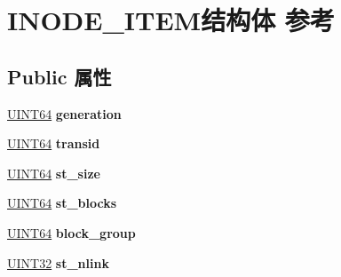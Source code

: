 \hypertarget{struct_i_n_o_d_e___i_t_e_m}{}\section{I\+N\+O\+D\+E\+\_\+\+I\+T\+E\+M结构体 参考}
\label{struct_i_n_o_d_e___i_t_e_m}
\subsection*{Public 属性}
\begin{DoxyCompactItemize}
\item 
\mbox{\label{struct_i_n_o_d_e___i_t_e_m_ae1213327dd2a96efffd134b49860bcc4}} 
\hyperlink{_processor_bind_8h_a57be03562867144161c1bfee95ca8f7c}{U\+I\+N\+T64} {\bfseries generation}
\item 
\mbox{\label{struct_i_n_o_d_e___i_t_e_m_aaff7c5d9d3e0c0fb381c4fcd719741be}} 
\hyperlink{_processor_bind_8h_a57be03562867144161c1bfee95ca8f7c}{U\+I\+N\+T64} {\bfseries transid}
\item 
\mbox{\label{struct_i_n_o_d_e___i_t_e_m_a495b37d08c43431b02232f6c1a5675f8}} 
\hyperlink{_processor_bind_8h_a57be03562867144161c1bfee95ca8f7c}{U\+I\+N\+T64} {\bfseries st\+\_\+size}
\item 
\mbox{\label{struct_i_n_o_d_e___i_t_e_m_a63b4e31230bb3bac45873bc339a9ac6f}} 
\hyperlink{_processor_bind_8h_a57be03562867144161c1bfee95ca8f7c}{U\+I\+N\+T64} {\bfseries st\+\_\+blocks}
\item 
\mbox{\label{struct_i_n_o_d_e___i_t_e_m_a3d9af38f997fa384fab6fbeed351bcff}} 
\hyperlink{_processor_bind_8h_a57be03562867144161c1bfee95ca8f7c}{U\+I\+N\+T64} {\bfseries block\+\_\+group}
\item 
\mbox{\label{struct_i_n_o_d_e___i_t_e_m_a3a8f81c2bb898c0f975f01ec997abed9}} 
\hyperlink{_processor_bind_8h_ae1e6edbbc26d6fbc71a90190d0266018}{U\+I\+N\+T32} {\bfseries st\+\_\+nlink}
\item 
\mbox{\label{struct_i_n_o_d_e___i_t_e_m_a3e05299cf1708f4ca60040c82a4fefcf}} 

\end{DoxyCompactItemize}
